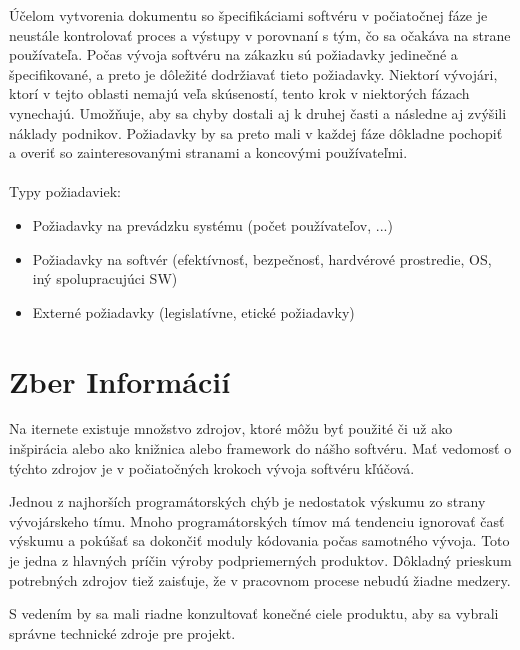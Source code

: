 \documentclass[10pt,twoside,slovak,a4paper]{article}
\begin{document}
Účelom vytvorenia dokumentu so špecifikáciami softvéru v počiatočnej fáze je neustále kontrolovať proces a výstupy v porovnaní s tým, čo sa očakáva na strane používateľa. Počas vývoja softvéru na zákazku sú požiadavky jedinečné a špecifikované, a preto je dôležité dodržiavať tieto požiadavky. Niektorí vývojári, ktorí v tejto oblasti nemajú veľa skúseností, tento krok v niektorých fázach vynechajú. Umožňuje, aby sa chyby dostali aj k druhej časti a následne aj zvýšili náklady podnikov. Požiadavky by sa preto mali v každej fáze dôkladne pochopiť a overiť so zainteresovanými stranami a koncovými používateľmi.
\\
\\
Typy požiadaviek:
\begin{itemize}
\item Požiadavky na prevádzku systému (počet používateľov, ...)
\item Požiadavky na softvér (efektívnosť, bezpečnosť, hardvérové prostredie, OS, iný spolupracujúci SW)
\item Externé požiadavky (legislatívne, etické požiadavky)
\end{itemize}
\cite{VyvojProces}






\section{Zber Informácií}

Na iternete existuje množstvo zdrojov, ktoré môžu byť použité či už ako inšpirácia alebo ako knižnica alebo framework do nášho softvéru.
Mať vedomosť o týchto zdrojov je v počiatočných krokoch vývoja softvéru kľúčová. 



Jednou z najhorších programátorských chýb je nedostatok výskumu zo strany vývojárskeho tímu. Mnoho programátorských tímov má tendenciu ignorovať časť výskumu a pokúšať sa dokončiť moduly kódovania počas samotného vývoja. Toto je jedna z hlavných príčin výroby podpriemerných produktov. Dôkladný prieskum potrebných zdrojov tiež zaisťuje, že v pracovnom procese nebudú žiadne medzery.

S vedením by sa mali riadne konzultovať konečné ciele produktu, aby sa vybrali správne technické zdroje pre projekt.
\end{document}
